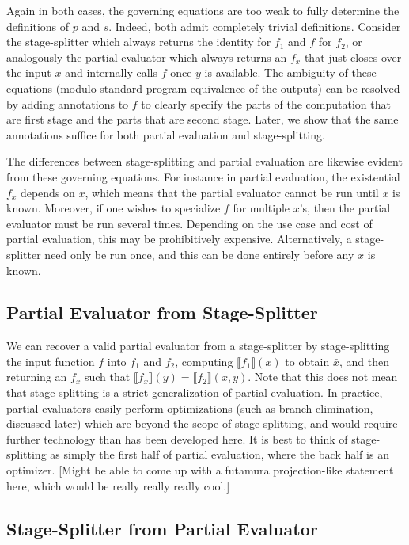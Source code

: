 \documentclass{sigplanconf}
\begin{document}
Again in both cases, the governing equations are too weak to fully determine the definitions of $p$ and $s$.  Indeed, both admit completely trivial definitions.  Consider the stage-splitter which always returns the identity for $f_1$ and $f$ for $f_2$, or analogously the partial evaluator which always returns an $f_x$ that just closes over the input $x$ and internally calls $f$ once $y$ is available. The ambiguity of these equations (modulo standard program equivalence of the outputs) can be resolved by adding annotations to $f$ to clearly specify the parts of the computation that are first stage and the parts that are second stage.  Later, we show that the same annotations suffice for both partial evaluation and stage-splitting.  

The differences between stage-splitting and partial evaluation are likewise evident from these governing equations.  For instance in partial evaluation, the existential $f_x$ depends on $x$, which means that the partial evaluator cannot be run until $x$ is known.  Moreover, if one wishes to specialize $f$ for multiple $x$'s, then the partial evaluator must be run several times.  Depending on the use case and cost of partial evaluation, this may be prohibitively expensive.  Alternatively, a stage-splitter need only be run once, and this can be done entirely before any $x$ is known.

\subsection{Partial Evaluator from Stage-Splitter}

We can recover a valid partial evaluator from a stage-splitter by stage-splitting the input function $f$ into $f_1$ and $f_2$, computing $\llbracket f_1 \rrbracket(x)$ to obtain $\bar x$, and then returning an $f_x$ such that $\llbracket f_x \rrbracket(y) = \llbracket f_2 \rrbracket(\bar x, y)$.  Note that this does not mean that stage-splitting is a strict generalization of partial evaluation.  In practice, partial evaluators easily perform optimizations (such as branch elimination, discussed later) which are beyond the scope of stage-splitting, and would require further technology than has been developed here.  It is best to think of stage-splitting as simply the first half of partial evaluation, where the back half is an optimizer. [Might be able to come up with a futamura projection-like statement here, which would be really really really cool.]

\subsection{Stage-Splitter from Partial Evaluator}
\end{document}
